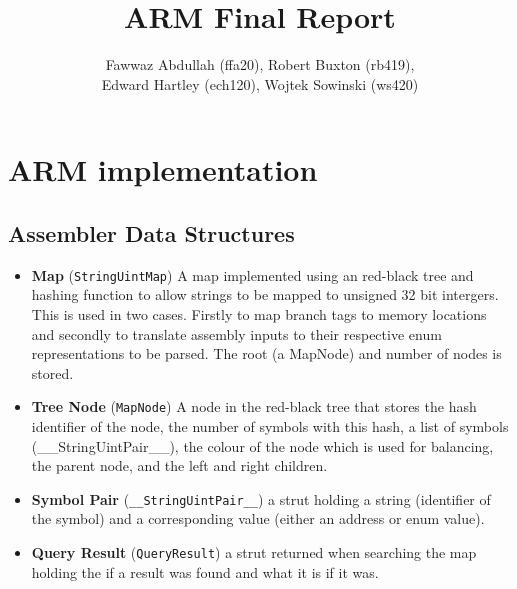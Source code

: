 \documentclass[8pt]{article}
\begin{document}
\title{ARM Final Report}
\author{Fawwaz Abdullah (ffa20), Robert Buxton (rb419), \\Edward Hartley (ech120), Wojtek Sowinski (ws420) }

\maketitle

\section{ARM implementation}

 
\subsection{Assembler Data Structures}

\begin{itemize}

    \item \textbf{Map} (\texttt{StringUintMap}) A map implemented using an
    red-black tree and hashing function to allow strings to be mapped to unsigned
    32 bit intergers. This is used in two cases. Firstly to map branch tags to 
    memory locations and secondly to translate assembly inputs to their respective
    enum representations to be parsed. The root (a MapNode) and number of nodes is stored.
    
    \item \textbf{Tree Node} (\texttt{MapNode}) A node in the red-black tree that 
    stores the hash identifier of the node, the number of symbols with this hash, 
    a list of symbols (\_\_StringUintPair\_\_), the colour of the node which is used for balancing, the 
    parent node, and the left and right children.

    \item \textbf{Symbol Pair} (\texttt{\_\_StringUintPair\_\_}) a strut holding a
    string (identifier of the symbol) and a corresponding value (either an 
    address or enum value). 

    
    \item \textbf{Query Result} (\texttt{QueryResult}) a strut returned when searching the map
    holding the if a result was found and what it is if it was.
    
    \end{itemize}
\end{document}
